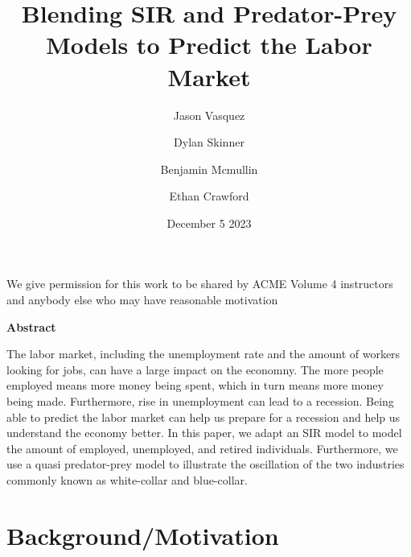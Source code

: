 \documentclass{article}
\title{Blending SIR and Predator-Prey Models to Predict the Labor Market}
\author{Jason Vasquez \and Dylan Skinner \and Benjamin Mcmullin \and Ethan Crawford}
\date{December 5 2023}
\begin{document}
\maketitle

We give permission for this work to be shared by ACME Volume 4 instructors and anybody else who may have reasonable motivation

\begin{center}
    \textbf{Abstract}
\end{center}

The labor market, including the unemployment rate and the amount of workers looking for jobs, can have a large impact on the economny.
The more people employed means more money being spent, which in turn means more money being made. 
Furthermore, rise in unemployment can lead to a recession. Being able to predict the labor market can help us prepare for a recession and help us understand the economy better.
In this paper, we adapt an SIR model to model the amount of employed, unemployed, and retired individuals.
Furthermore, we use a quasi predator-prey model to illustrate the oscillation of the two industries commonly known as white-collar and blue-collar.

\section{Background/Motivation}



\end{document}
